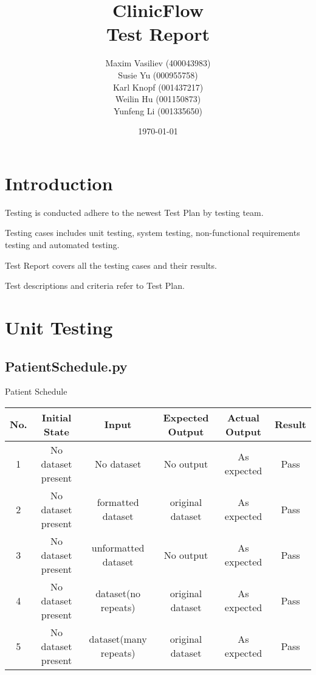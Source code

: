 \documentclass[12pt]{article}
\title{
ClinicFlow
\\\vspace{10mm}
\Large \textbf{Test Report}
\vspace{40mm}
}
\author{ Maxim Vasiliev (400043983)
\\
Susie Yu \quad (000955758)
\\
Karl Knopf \quad (001437217)
\\
Weilin Hu \quad (001150873)
\\
Yunfeng Li \quad (001335650)
}
\date{\today}
\begin{document}
\maketitle
\newpage
\tableofcontents
\newpage
{}
\setlength\parindent{0pt}


\section{Introduction}

Testing is conducted adhere to the newest Test Plan by testing team. 

Testing cases includes unit testing, 
system testing, non-functional requirements testing and automated testing. 

Test Report covers all the testing cases and their results. 

Test descriptions and criteria refer to Test Plan. 

\quad

\quad

\quad

\quad

\section{Unit Testing}

\quad


\subsection{PatientSchedule.py}


\vspace{-5pt}

Patient Schedule

\vspace{10pt}

\begin{tabular}{|c|c|c|c|c|c|}
\hline
\textbf{No.}  & \textbf{Initial State} & \textbf{Input} & \textbf{Expected Output} & \textbf{Actual Output} & \textbf{Result}
\\ \hline
1  & No dataset present & No dataset & No output & As expected & Pass
\\ \hline
2  & No dataset present & formatted dataset & original dataset & As expected & Pass
\\ \hline
3  & No dataset present & unformatted dataset & No output & As expected & Pass
\\ \hline
4  & No dataset present & dataset(no repeats) & original dataset & As expected & Pass
\\ \hline
5  & No dataset present & dataset(many repeats) & original dataset & As expected & Pass
\\ \hline
\end{tabular}\\
\end{document}
